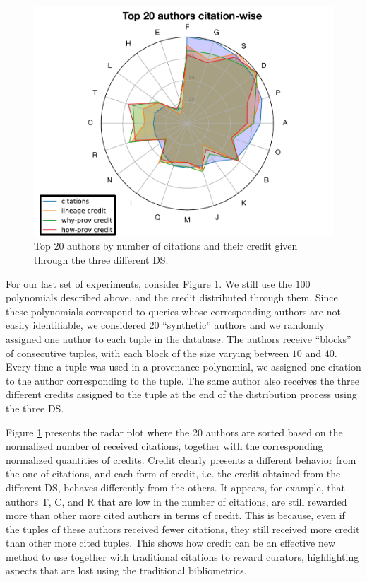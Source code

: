 \begin{figure}[]
\centering
  \includegraphics[width=.8\textwidth]{figures/radar_top_synthetic_enhanced}
  \caption{Top 20 authors by number of citations and their credit given through the three different DS.}
  \label{figure:synthetic_authors}
\end{figure}

For our last set of experiments, consider Figure \ref{figure:synthetic_authors}.
We still use the $100$ polynomials described above, and the credit distributed through them. Since these polynomials correspond to queries whose corresponding authors are not easily identifiable, we considered $20$ ``synthetic'' authors and we randomly assigned one author to each tuple in the database. The authors receive ``blocks'' of consecutive tuples, with each block of the size varying between $10$ and $40$. 
Every time a tuple was used in a provenance polynomial, we assigned one citation to the author corresponding to the tuple.  The same author also receives the three different credits assigned to the tuple at the end of the distribution process using the three DS.

Figure \ref{figure:synthetic_authors} presents the radar plot where the 20 authors are sorted based on the normalized number of received citations, together with the corresponding normalized quantities of credits.
Credit clearly presents a different behavior from the one of citations, and each form of credit, i.e. the credit obtained from the different DS, behaves differently from the others.
It appears, for example, that authors T, C, and R that are low in the number of citations, are still rewarded more than other more cited authors in terms of credit.
This is because, even if the tuples of these authors received fewer citations, they still received more credit than other more cited tuples. This shows how credit can be an effective new method to use together with traditional citations to reward curators, highlighting aspects that are lost using the traditional bibliometrics.

